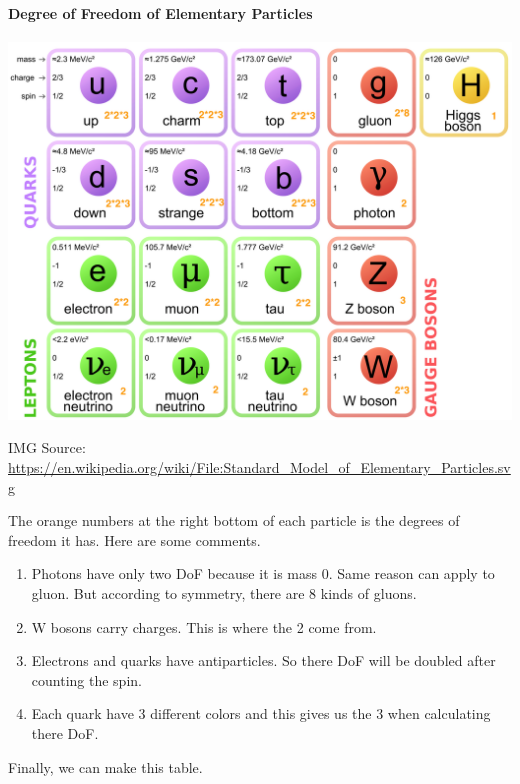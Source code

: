 \documentclass[letterpaper,10pt,english]{sphinxmanual}
\begin{document}
{\paragraph{Degree of Freedom of Elementary Particles}
\label{Cosmology/cosmoIndex:degree-of-freedom-of-elementary-particles}
\includegraphics{Standard_Model_of_Elementary_Particles.png}

IMG Source: \href{https://en.wikipedia.org/wiki/File:Standard\_Model\_of\_Elementary\_Particles.svg}{https://en.wikipedia.org/wiki/File:Standard\_Model\_of\_Elementary\_Particles.svg}

The orange numbers at the right bottom of each particle is the degrees of freedom it has. Here are some comments.
\begin{enumerate}
\item {} 
Photons have only two DoF because it is mass 0. Same reason can apply to gluon. But according to symmetry, there are 8 kinds of gluons.

\item {} 
W bosons carry charges. This is where the 2 come from.

\item {} 
Electrons and quarks have antiparticles. So there DoF will be doubled after counting the spin.

\item {} 
Each quark have 3 different colors and this gives us the 3 when calculating there DoF.

\end{enumerate}

Finally, we can make this table.

}
\end{document}

